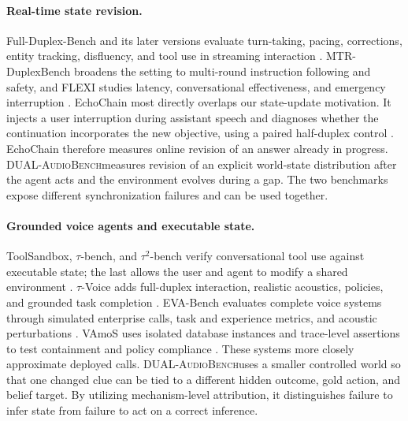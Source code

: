 \documentclass{article}
\newcommand{\benchmark}{\textsc{DUAL-AudioBench}}
\begin{document}
\paragraph{Real-time state revision.}
Full-Duplex-Bench and its later versions evaluate turn-taking, pacing, corrections, entity tracking, disfluency, and tool use in streaming interaction \citep{lin2025fullduplex,lin2025fullduplexv2,lin2026fullduplexv3}. MTR-DuplexBench broadens the setting to multi-round instruction following and safety, and FLEXI studies latency, conversational effectiveness, and emergency interruption \citep{zhang2025mtrduplex,ge2025flexi}. EchoChain most directly overlaps our state-update motivation. It injects a user interruption during assistant speech and diagnoses whether the continuation incorporates the new objective, using a paired half-duplex control \citep{modi2026echochain}. EchoChain therefore measures online revision of an answer already in progress. \benchmark measures revision of an explicit world-state distribution after the agent acts and the environment evolves during a gap. The two benchmarks expose different synchronization failures and can be used together.

\paragraph{Grounded voice agents and executable state.}
ToolSandbox, $\tau$-bench, and $\tau^2$-bench verify conversational tool use against executable state; the last allows the user and agent to modify a shared environment \citep{lu2024toolsandbox,yao2024taubench,barres2025tau2}. $\tau$-Voice adds full-duplex interaction, realistic acoustics, policies, and grounded task completion \citep{ray2026tauvoice}. EVA-Bench evaluates complete voice systems through simulated enterprise calls, task and experience metrics, and acoustic perturbations \citep{bogavelli2026evabench}. VAmoS uses isolated database instances and trace-level assertions to test containment and policy compliance \citep{meyer2026vamos}. These systems more closely approximate deployed calls. \benchmark uses a smaller controlled world so that one changed clue can be tied to a different hidden outcome, gold action, and belief target. By utilizing mechanism-level attribution, it distinguishes failure to infer state from failure to act on a correct inference.
\end{document}
